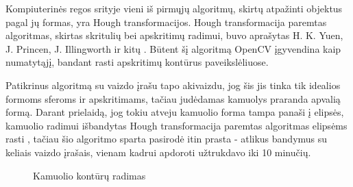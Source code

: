 \documentclass{VUMIFPSbakalaurinis}
\begin{document}
Kompiuterinės regos srityje vieni iš pirmųjų algoritmų, skirtų atpažinti objektus pagal jų formas, yra Hough transformacijos.
Hough transformacija paremtas algoritmas, skirtas skritulių bei apskritimų radimui, buvo aprašytas H. K. Yuen, J. Princen, J. Illingworth ir kitų \cite{YUEN199071}. Būtent šį algoritmą OpenCV įgyvendina kaip numatytąjį, bandant rasti apskritimų kontūrus paveikslėliuose.

Patikrinus algoritmą su vaizdo įrašu tapo akivaizdu, jog šis jis tinka tik idealios formoms sferoms ir apskritimams, tačiau judėdamas kamuolys praranda apvalią formą. Darant prielaidą, jog tokiu atveju kamuolio forma tampa panaši į elipsės, kamuolio radimui išbandytas Hough transformacija paremtas algoritmas elipsėms rasti \cite{1048464}, tačiau šio algoritmo sparta pasirodė itin prasta - atlikus bandymus su keliais vaizdo įrašais, vienam kadrui apdoroti užtrukdavo iki 10 minučių.

\begin{figure}[H]
	\centering
	\qquad
	\caption{Kamuolio kontūrų radimas}
	\label{fig:contours}
\end{figure}
\end{document}
